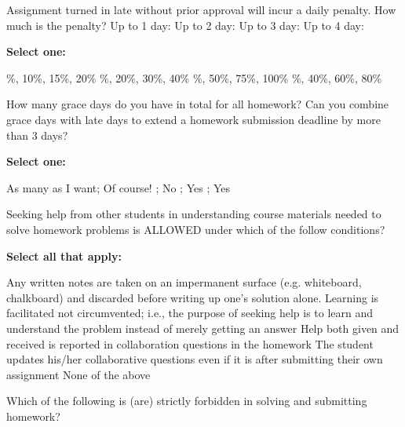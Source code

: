 \documentclass[11pt,addpoints,answers]{exam}
\numberwithin{equation}{section} %
\numberwithin{figure}{section} %
\numberwithin{table}{section} %
\begin{document}
\begin{questions}
    \question[1] Assignment turned in late without prior approval will incur a daily penalty. How much is the penalty? Up to 1 day: \underline{\hspace{0.5cm}} Up to 2 day: \underline{\hspace{0.5cm}} Up to 3 day:
    \underline{\hspace{0.5cm}} Up to 4 day:
    \underline{\hspace{0.5cm}} 
    
    \textbf{Select one:}
    \begin{checkboxes}
        \%, 10\%, 15\%, 20\%
        \%, 20\%, 30\%, 40\%
        \%, 50\%, 75\%, 100\%
        \%, 40\%, 60\%, 80\%
    \end{checkboxes}

    
    \question[1] How many grace days do you have in total for all homework? Can you combine grace days with late days to extend a homework submission deadline by more than 3 days?
    
    \textbf{Select one:}
    \begin{checkboxes}
        \choice As many as I want; Of course!
        ; No
        ; Yes
        ; Yes
    \end{checkboxes}

    
    \question[1] Seeking help from other students in understanding course materials needed to solve homework problems is ALLOWED under which of the follow conditions?
    
    \textbf{Select all that apply:}
    {%
    \checkboxchar{$\Box$} \checkedchar{$\blacksquare$}
        \begin{checkboxes}
        \choice Any written notes are taken on an impermanent surface (e.g. whiteboard, chalkboard) and discarded before writing up one's solution alone.
        \choice Learning is facilitated not circumvented; i.e., the purpose of seeking help is to learn and understand the problem instead of merely getting an answer
        \choice Help both given and received is reported in collaboration questions in the homework
        \choice The student updates his/her collaborative questions even if it is after submitting their own assignment
        \choice None of the above
    \end{checkboxes}
    }
\clearpage
    
    \question[1] Which of the following is (are) strictly forbidden in solving and submitting homework?
    

\end{questions}
\end{document}
